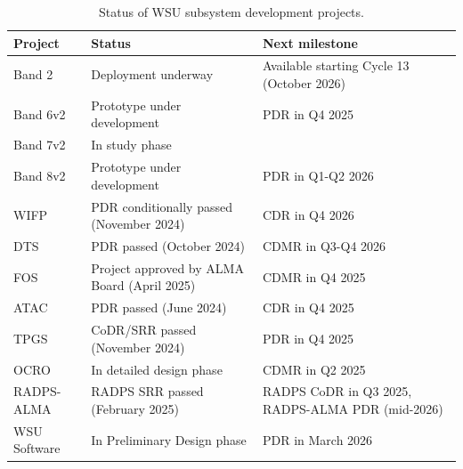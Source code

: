 \begin{table}[htb!]
\centering
\caption{Status of WSU subsystem development projects.}
\label{tbl:status_projects}
\begin{tabularx}{\textwidth}{|l|X|X|}
\hline
\textbf{Project} & \textbf{Status} & \textbf{Next milestone}\\
\hline
Band 2 & Deployment underway & Available starting Cycle 13 (October 2026)\\
\hline
Band 6v2 & Prototype under development & PDR in Q4 2025\\
\hline
Band 7v2 & In study phase & \\
\hline
Band 8v2 & Prototype under development & PDR in Q1-Q2 2026\\
\hline
WIFP & PDR conditionally passed (November 2024) & \acs{CDR} in Q4 2026\\
\hline
DTS & \acs{PDR} passed (October 2024) & \acs{CDMR} in Q3-Q4 2026\\
\hline
FOS & Project approved by ALMA Board (April 2025)  & \acs{CDMR} in Q4 2025\\
\hline 
ATAC & \ac{PDR} passed (June 2024) & \acs{CDR} in Q4 2025\\
\hline
TPGS & \acs{CoDR}/SRR passed (November 2024) & \acs{PDR} in Q4 2025\\
\hline
OCRO & In detailed design phase & \acs{CDMR} in Q2 2025\\
\hline
RADPS-ALMA & RADPS SRR passed (February 2025) & RADPS CoDR in Q3 2025, RADPS-ALMA \acs{PDR} (mid-2026)\\
\hline
WSU Software & In Preliminary Design phase & PDR in March 2026\\
\hline
\end{tabularx}
\end{table}